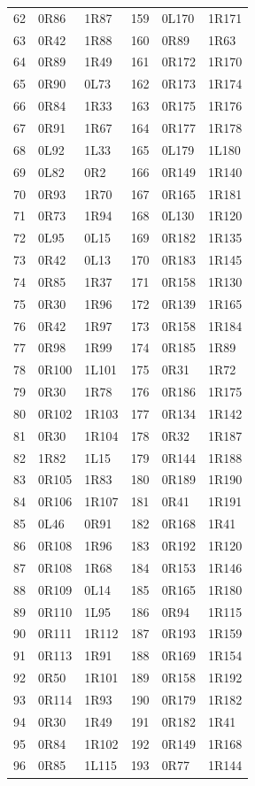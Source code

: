 \begin{longtable}{rll@{\qquad\qquad}rll}
62 & 0R86 & 1R87 & 159 & 0L170 & 1R171\\
63 & 0R42 & 1R88 & 160 & 0R89 & 1R63\\
64 & 0R89 & 1R49 & 161 & 0R172 & 1R170\\
65 & 0R90 & 0L73 & 162 & 0R173 & 1R174\\
66 & 0R84 & 1R33 & 163 & 0R175 & 1R176\\
67 & 0R91 & 1R67 & 164 & 0R177 & 1R178\\
68 & 0L92 & 1L33 & 165 & 0L179 & 1L180\\
69 & 0L82 & 0R2 & 166 & 0R149 & 1R140\\
70 & 0R93 & 1R70 & 167 & 0R165 & 1R181\\
71 & 0R73 & 1R94 & 168 & 0L130 & 1R120\\
72 & 0L95 & 0L15 & 169 & 0R182 & 1R135\\
73 & 0R42 & 0L13 & 170 & 0R183 & 1R145\\
74 & 0R85 & 1R37 & 171 & 0R158 & 1R130\\
75 & 0R30 & 1R96 & 172 & 0R139 & 1R165\\
76 & 0R42 & 1R97 & 173 & 0R158 & 1R184\\
77 & 0R98 & 1R99 & 174 & 0R185 & 1R89\\
78 & 0R100 & 1L101 & 175 & 0R31 & 1R72\\
79 & 0R30 & 1R78 & 176 & 0R186 & 1R175\\
80 & 0R102 & 1R103 & 177 & 0R134 & 1R142\\
81 & 0R30 & 1R104 & 178 & 0R32 & 1R187\\
82 & 1R82 & 1L15 & 179 & 0R144 & 1R188\\
83 & 0R105 & 1R83 & 180 & 0R189 & 1R190\\
84 & 0R106 & 1R107 & 181 & 0R41 & 1R191\\
85 & 0L46 & 0R91 & 182 & 0R168 & 1R41\\
86 & 0R108 & 1R96 & 183 & 0R192 & 1R120\\
87 & 0R108 & 1R68 & 184 & 0R153 & 1R146\\
88 & 0R109 & 0L14 & 185 & 0R165 & 1R180\\
89 & 0R110 & 1L95 & 186 & 0R94 & 1R115\\
90 & 0R111 & 1R112 & 187 & 0R193 & 1R159\\
91 & 0R113 & 1R91 & 188 & 0R169 & 1R154\\
92 & 0R50 & 1R101 & 189 & 0R158 & 1R192\\
93 & 0R114 & 1R93 & 190 & 0R179 & 1R182\\
94 & 0R30 & 1R49 & 191 & 0R182 & 1R41\\
95 & 0R84 & 1R102 & 192 & 0R149 & 1R168\\
96 & 0R85 & 1L115 & 193 & 0R77 & 1R144\\
\bottomrule\end{longtable}
\endgroup
